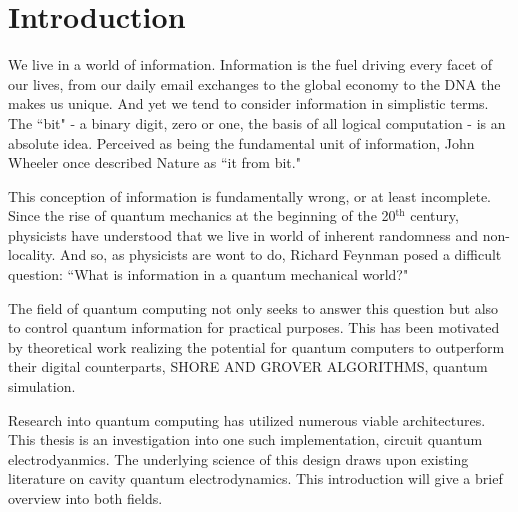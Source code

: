 \documentclass[12 pt]{book}
\begin{document}
\chapter{Introduction}\label{chap:Introduction}

We live in a world of information. Information is the fuel driving every facet of our lives, from our daily email exchanges to the global economy to the DNA the makes us unique. And yet we tend to consider information in simplistic terms. The ``bit" - a binary digit, zero or one, the basis of all logical computation - is an absolute idea. Perceived as being the fundamental unit of information, John Wheeler once described Nature as ``it from bit."

This conception of information is fundamentally wrong, or at least incomplete. Since the rise of quantum mechanics at the beginning of the 20$^{\mathrm{th}}$ century, physicists have understood that we live in world of inherent randomness and non-locality. And so, as physicists are wont to do, Richard Feynman posed a difficult question: ``What is information in a quantum mechanical world?" 

The field of quantum computing not only seeks to answer this question but also to control quantum information for practical purposes. This has been motivated by theoretical work realizing the potential for quantum computers to outperform their digital counterparts, SHORE AND GROVER ALGORITHMS, quantum simulation. 

Research into quantum computing has utilized numerous viable architectures. This thesis is an investigation into one such implementation, circuit quantum electrodyanmics. The underlying science of this design draws upon existing literature on cavity quantum electrodynamics. This introduction will give a brief overview into both fields. 
\end{document}
